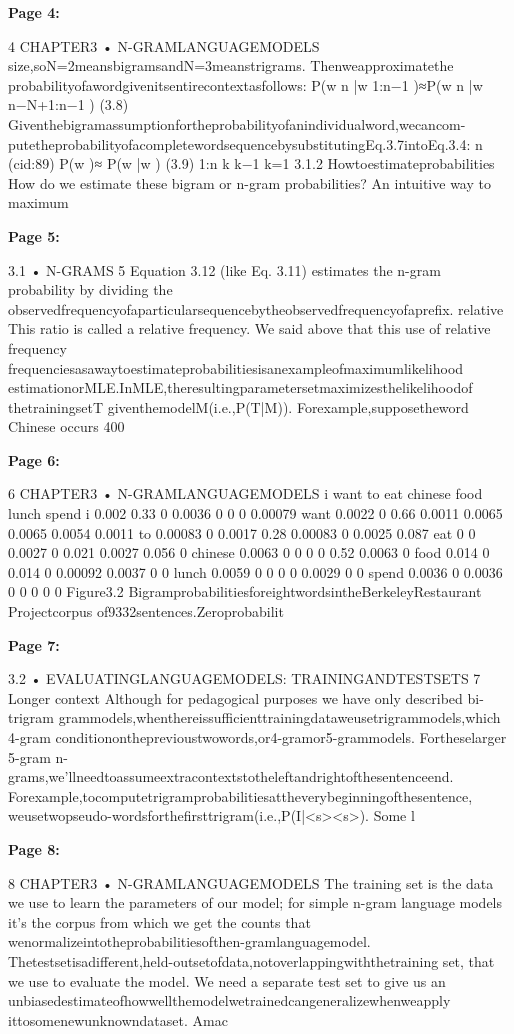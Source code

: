 \documentclass[11pt,a4paper]{article}
\begin{document}
\textbf{Page 4:}

4 CHAPTER3 • N-GRAMLANGUAGEMODELS
size,soN=2meansbigramsandN=3meanstrigrams. Thenweapproximatethe
probabilityofawordgivenitsentirecontextasfollows:
P(w n |w 1:n−1 )≈P(w n |w n−N+1:n−1 ) (3.8)
Giventhebigramassumptionfortheprobabilityofanindividualword,wecancom-
putetheprobabilityofacompletewordsequencebysubstitutingEq.3.7intoEq.3.4:
n
(cid:89)
P(w )≈ P(w |w ) (3.9)
1:n k k−1
k=1
3.1.2 Howtoestimateprobabilities
How do we estimate these bigram or n-gram probabilities? An intuitive way to
maximum


\textbf{Page 5:}

3.1 • N-GRAMS 5
Equation 3.12 (like Eq. 3.11) estimates the n-gram probability by dividing the
observedfrequencyofaparticularsequencebytheobservedfrequencyofaprefix.
relative This ratio is called a relative frequency. We said above that this use of relative
frequency
frequenciesasawaytoestimateprobabilitiesisanexampleofmaximumlikelihood
estimationorMLE.InMLE,theresultingparametersetmaximizesthelikelihoodof
thetrainingsetT giventhemodelM(i.e.,P(T|M)). Forexample,supposetheword
Chinese occurs 400 

\textbf{Page 6:}

6 CHAPTER3 • N-GRAMLANGUAGEMODELS
i want to eat chinese food lunch spend
i 0.002 0.33 0 0.0036 0 0 0 0.00079
want 0.0022 0 0.66 0.0011 0.0065 0.0065 0.0054 0.0011
to 0.00083 0 0.0017 0.28 0.00083 0 0.0025 0.087
eat 0 0 0.0027 0 0.021 0.0027 0.056 0
chinese 0.0063 0 0 0 0 0.52 0.0063 0
food 0.014 0 0.014 0 0.00092 0.0037 0 0
lunch 0.0059 0 0 0 0 0.0029 0 0
spend 0.0036 0 0.0036 0 0 0 0 0
Figure3.2 BigramprobabilitiesforeightwordsintheBerkeleyRestaurant Projectcorpus
of9332sentences.Zeroprobabilit

\textbf{Page 7:}

3.2 • EVALUATINGLANGUAGEMODELS: TRAININGANDTESTSETS 7
Longer context Although for pedagogical purposes we have only described bi-
trigram grammodels,whenthereissufficienttrainingdataweusetrigrammodels,which
4-gram conditionontheprevioustwowords,or4-gramor5-grammodels. Fortheselarger
5-gram n-grams,we’llneedtoassumeextracontextstotheleftandrightofthesentenceend.
Forexample,tocomputetrigramprobabilitiesattheverybeginningofthesentence,
weusetwopseudo-wordsforthefirsttrigram(i.e.,P(I|<s><s>).
Some l

\textbf{Page 8:}

8 CHAPTER3 • N-GRAMLANGUAGEMODELS
The training set is the data we use to learn the parameters of our model; for
simple n-gram language models it’s the corpus from which we get the counts that
wenormalizeintotheprobabilitiesofthen-gramlanguagemodel.
Thetestsetisadifferent,held-outsetofdata,notoverlappingwiththetraining
set, that we use to evaluate the model. We need a separate test set to give us an
unbiasedestimateofhowwellthemodelwetrainedcangeneralizewhenweapply
ittosomenewunknowndataset. Amac
\end{document}
